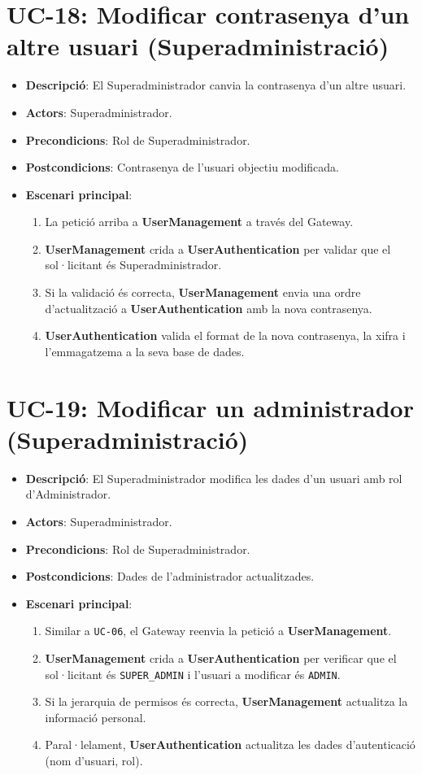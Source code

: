 \section{UC-18: Modificar contrasenya d'un altre usuari (Superadministració)}
\begin{itemize}
    \item \textbf{Descripció}: El Superadministrador canvia la contrasenya d'un altre usuari.
    \item \textbf{Actors}: Superadministrador.
    \item \textbf{Precondicions}: Rol de Superadministrador.
    \item \textbf{Postcondicions}: Contrasenya de l'usuari objectiu modificada.
    \item \textbf{Escenari principal}:
    \begin{enumerate}
        \item La petició arriba a \textbf{UserManagement} a través del Gateway.
        \item \textbf{UserManagement} crida a \textbf{UserAuthentication} per validar que el sol·licitant és Superadministrador.
        \item Si la validació és correcta, \textbf{UserManagement} envia una ordre d'actualització a \textbf{UserAuthentication} amb la nova contrasenya.
        \item \textbf{UserAuthentication} valida el format de la nova contrasenya, la xifra i l'emmagatzema a la seva base de dades.
    \end{enumerate}
\end{itemize}

\section{UC-19: Modificar un administrador (Superadministració)}
\begin{itemize}
    \item \textbf{Descripció}: El Superadministrador modifica les dades d'un usuari amb rol d'Administrador.
    \item \textbf{Actors}: Superadministrador.
    \item \textbf{Precondicions}: Rol de Superadministrador.
    \item \textbf{Postcondicions}: Dades de l'administrador actualitzades.
    \item \textbf{Escenari principal}:
    \begin{enumerate}
        \item Similar a \texttt{UC-06}, el Gateway reenvia la petició a \textbf{UserManagement}.
        \item \textbf{UserManagement} crida a \textbf{UserAuthentication} per verificar que el sol·licitant és \texttt{SUPER\_ADMIN} i l'usuari a modificar és \texttt{ADMIN}.
        \item Si la jerarquia de permisos és correcta, \textbf{UserManagement} actualitza la informació personal.
        \item Paral·lelament, \textbf{UserAuthentication} actualitza les dades d'autenticació (nom d'usuari, rol).
    \end{enumerate}
\end{itemize}

